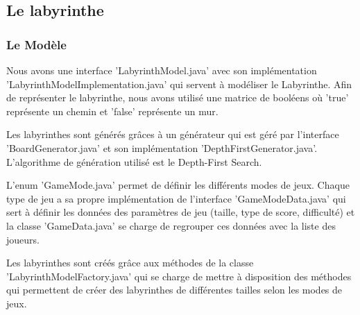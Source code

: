 \subsection{Le labyrinthe}
\label{subsec:labyrinthe}


\subsubsection{Le Modèle}

Nous avons une interface 'LabyrinthModel.java' avec son implémentation 'LabyrinthModelImplementation.java' qui servent à modéliser le Labyrinthe. Afin de représenter le labyrinthe, nous avons utilisé une matrice de booléens où 'true' représente un chemin et 'false' représente un mur.

Les labyrinthes sont générés grâces à un générateur qui est géré par l'interface 'BoardGenerator.java' et son implémentation 'DepthFirstGenerator.java'. L'algorithme de génération utilisé est le Depth-First Search.

L'enum 'GameMode.java' permet de définir les différents modes de jeux. Chaque type de jeu a sa propre implémentation de l'interface 'GameModeData.java' qui sert à définir les données des paramètres de jeu (taille, type de score, difficulté) et la classe 'GameData.java' se charge de regrouper ces données avec la liste des joueurs.

Les labyrinthes sont créés grâce aux méthodes de la classe 'LabyrinthModelFactory.java' qui se charge de mettre à disposition des méthodes qui permettent de créer des labyrinthes de différentes tailles selon les modes de jeux.

